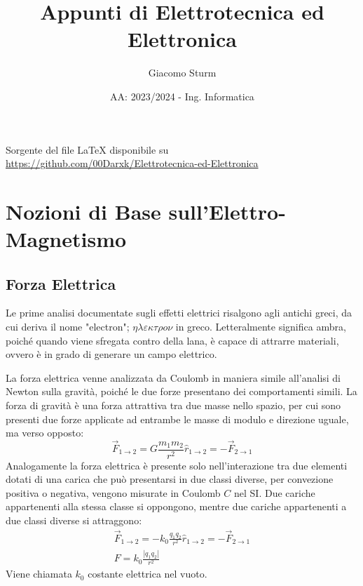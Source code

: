 \documentclass{article}
\title{Appunti di Elettrotecnica ed Elettronica}
\author{Giacomo Sturm}
\date{AA: 2023/2024 - Ing. Informatica}
\numberwithin{equation}{subsection}
\begin{document}
\maketitle

\vspace{10mm}

\begin{center}
    Sorgente del file LaTeX disponibile su \url{https://github.com/00Darxk/Elettrotecnica-ed-Elettronica}
\end{center}

\clearpage

\tableofcontents

\clearpage

\section{Nozioni di Base sull'Elettro-Magnetismo}

\subsection{Forza Elettrica}
Le prime analisi documentate sugli effetti elettrici risalgono agli antichi greci, da cui deriva il nome "electron"; $\eta\lambda\varepsilon\kappa\tau\rho o\nu$ in greco. Letteralmente significa ambra, poiché 
quando viene sfregata contro della lana, è capace di attrarre materiali, ovvero è in grado di generare un campo elettrico.

La forza elettrica venne analizzata da Coulomb in maniera simile all'analisi di Newton sulla gravità, poiché le due forze presentano dei comportamenti simili. La forza di 
gravità è una forza attrattiva tra due masse nello spazio, per cui sono presenti due forze applicate ad entrambe le masse di modulo e direzione uguale, ma verso opposto: 
\begin{equation*}
    \vec{F}_{1\to2}=G\displaystyle\frac{m_1m_2}{r^2}\hat{r}_{1\to2}=-\vec{F}_{2\to1}
\end{equation*}
Analogamente la forza elettrica è presente solo nell'interazione tra due elementi dotati di una carica che può presentarsi in due classi diverse, per convezione 
positiva o negativa, vengono misurate in Coulomb $C$ nel SI. Due cariche appartenenti alla stessa classe si oppongono, mentre due cariche appartenenti a due classi diverse 
si attraggono:
\begin{gather}
    \vec{F}_{1\to2}=-k_0\displaystyle\frac{q_1q_2}{r^2}\hat{r}_{1\to2}=-\vec{F}_{2\to1}\\
    F=k_0\displaystyle\frac{|q_1q_2|}{r^2}
\end{gather} 
Viene chiamata $k_0$ costante elettrica nel vuoto. 
\end{document}
